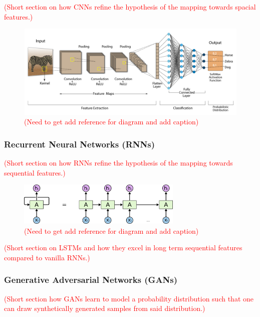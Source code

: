 \textcolor{red}{(Short section on how CNNs refine the hypothesis of the
    mapping towards spacial features.)}

\begin{figure}[H]
    \centering
    \includegraphics[width=\textwidth]{graphics/cnn_banner.png}
    \caption{\textcolor{red}{(Need to get add reference for diagram and add caption)}}
\end{figure}

\subsubsection{Recurrent Neural Networks (RNNs)\label{ssec:rnn}}

\textcolor{red}{(Short section on how RNNs refine the hypothesis of the
    mapping towards sequential features.)}

\begin{figure}[H]
    \centering
    \includegraphics[width=0.7\textwidth]{graphics/RNN-unrolled.png}
    \caption{\textcolor{red}{(Need to get add reference for diagram and add caption)}}
\end{figure}

\textcolor{red}{(Short section on LSTMs and how they excel in long term
    sequential features compared to vanilla RNNs.)}

\subsubsection{Generative Adversarial Networks (GANs)\label{ssec:gan}}

\textcolor{red}{(Short section how GANs learn to model a probability
    distribution such that one can draw synthetically generated samples
    from said distribution.)}

